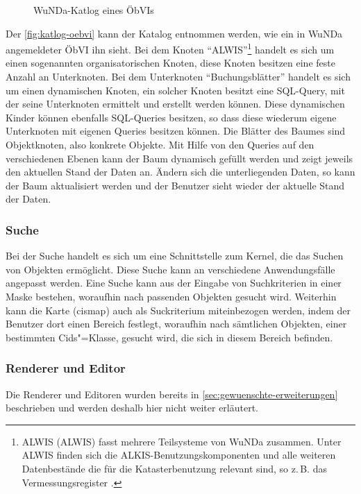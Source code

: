 \begin{figure}[htb]
	\centering
	\caption{WuNDa-Katlog eines ÖbVIs}
	\label{fig:katlog-oebvi}
\end{figure}

Der \autoref{fig:katlog-oebvi} kann der Katalog entnommen werden, wie ein in \ac{WuNDa} angemeldeter \ac{ÖbVI} ihn sieht.
Bei dem Knoten \enquote{\acs{ALWIS}}\footnote{
\acs{ALWIS} (\acl{ALWIS}) fasst mehrere Teilsysteme von \ac{WuNDa} zusammen. Unter \acs{ALWIS} finden sich die ALKIS-Benutzungskomponenten und alle weiteren Datenbestände die für die Katasterbenutzung relevant sind, so z.\,B. das Vermessungsregister \autocite[vgl.][]{wupp-wunda-oebvi}.}
handelt es sich um einen sogenannten organisatorischen Knoten, diese Knoten besitzen eine feste Anzahl an Unterknoten.
Bei dem Unterknoten \enquote{Buchungsblätter} handelt es sich um einen dynamischen Knoten, ein solcher Knoten besitzt eine SQL-Query, mit der seine Unterknoten ermittelt und erstellt werden können.
Diese dynamischen Kinder können ebenfalls SQL-Queries besitzen, so dass diese wiederum eigene Unterknoten mit eigenen Queries besitzen können.
Die Blätter des Baumes sind Objektknoten, also konkrete Objekte.
Mit Hilfe von den Queries auf den verschiedenen Ebenen kann der Baum dynamisch gefüllt werden und zeigt jeweils den aktuellen Stand der Daten an.
Ändern sich die unterliegenden Daten, so kann der Baum aktualisiert werden und der Benutzer sieht wieder der aktuelle Stand der Daten.

\subsubsection{Suche}
Bei der Suche handelt es sich um eine Schnittstelle zum Kernel, die das Suchen von Objekten ermöglicht.
Diese Suche kann an verschiedene Anwendungsfälle angepasst werden.
Eine Suche kann aus der Eingabe von Suchkriterien in einer Maske bestehen, woraufhin nach passenden Objekten gesucht wird.
Weiterhin kann die Karte (cismap) auch als Suckriterium miteinbezogen werden, indem der Benutzer dort einen Bereich festlegt, woraufhin nach sämtlichen Objekten, einer bestimmten Cids"=Klasse, gesucht wird, die sich in diesem Bereich befinden.

\subsubsection{Renderer und Editor}
Die Renderer und Editoren wurden bereits in \autoref{sec:gewuenschte-erweiterungen} beschrieben und werden deshalb hier nicht weiter erläutert.

